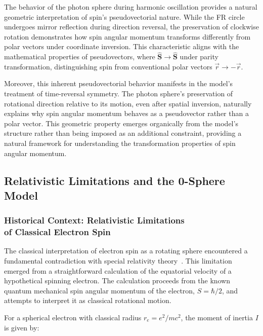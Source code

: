\documentclass[%
 reprint,
 amsmath,amssymb,
 aps,
]{revtex4-1}
\numberwithin{equation}{section}%
\begin{document}
The behavior of the photon sphere during harmonic oscillation provides a natural geometric interpretation of spin's pseudovectorial nature. While the FR circle undergoes mirror reflection during direction reversal, the preservation of clockwise rotation demonstrates how spin angular momentum transforms differently from polar vectors under coordinate inversion. This characteristic aligns with the mathematical properties of pseudovectors, where \( \hat{\boldsymbol{S}} \rightarrow \hat{\boldsymbol{S}} \) under parity transformation, distinguishing spin from conventional polar vectors \( \vec{r} \rightarrow -\vec{r} \).

Moreover, this inherent pseudovectorial behavior manifests in the model's treatment of time-reversal symmetry. The photon sphere's preservation of rotational direction relative to its motion, even after spatial inversion, naturally explains why spin angular momentum behaves as a pseudovector rather than a polar vector. This geometric property emerges organically from the model's structure rather than being imposed as an additional constraint, providing a natural framework for understanding the transformation properties of spin angular momentum.


\subsection{Relativistic Limitations and the 0-Sphere Model}
\label{sec:rel_limit_0sphere}

\subsubsection{Historical Context: Relativistic Limitations \\of Classical Electron Spin}
\label{subsec:hist_context}

The classical interpretation of electron spin as a rotating sphere encountered a fundamental contradiction with special relativity theory~\cite{Tomonaga1997}. This limitation emerged from a straightforward calculation of the equatorial velocity of a hypothetical spinning electron. The calculation proceeds from the known quantum mechanical spin angular momentum of the electron, $S = \hbar/2$, and attempts to interpret it as classical rotational motion.

For a spherical electron with classical radius $r_e = e^2/mc^2$, the moment of inertia $I$ is given by:
\end{document}
